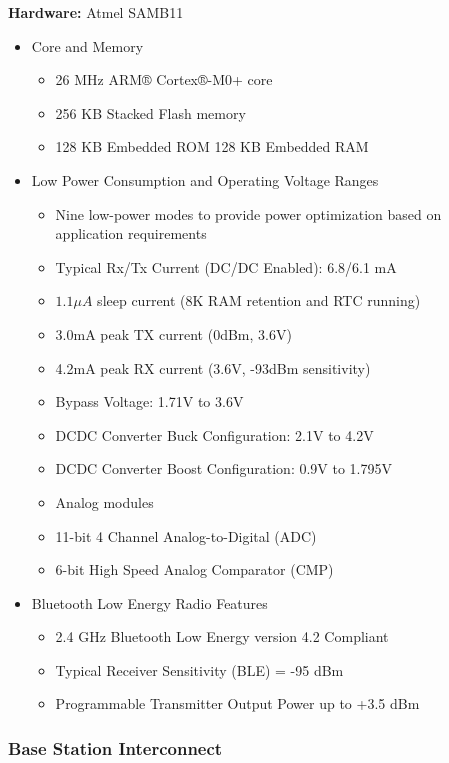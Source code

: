 \documentclass[journal,compsoc]{IEEEtran}
\begin{document}
\textbf {Hardware:} Atmel SAMB11

\begin{itemize}
  \item Core and Memory
    \begin{itemize}
      \item 26 MHz ARM® Cortex®-M0+ core
      \item 256 KB Stacked Flash memory
      \item 128 KB Embedded ROM
        128 KB Embedded RAM
    \end{itemize}
  \item Low Power Consumption and Operating Voltage Ranges
    \begin{itemize}
      \item Nine low-power modes to provide power optimization based on application requirements
      \item Typical Rx/Tx Current (DC/DC Enabled): 6.8/6.1 mA
      \item $1.1\mu A$ sleep current (8K RAM retention and RTC running)
      \item 3.0mA peak TX current (0dBm, 3.6V)
      \item 4.2mA peak RX current (3.6V, -93dBm sensitivity)
      \item Bypass Voltage: 1.71V to 3.6V
      \item DCDC Converter Buck Configuration: 2.1V to 4.2V
      \item DCDC Converter Boost Configuration: 0.9V to 1.795V
      \item Analog modules
      \item 11-bit 4 Channel Analog-to-Digital (ADC)
      \item 6-bit High Speed Analog Comparator (CMP)
    \end{itemize}
  \item Bluetooth Low Energy Radio Features
    \begin{itemize}
      \item 2.4 GHz Bluetooth Low Energy version 4.2 Compliant
      \item Typical Receiver Sensitivity (BLE) = -95 dBm
      \item Programmable Transmitter Output Power up to +3.5 dBm
    \end{itemize}
\end{itemize}

\subsubsection{Base Station Interconnect}
\end{document}
